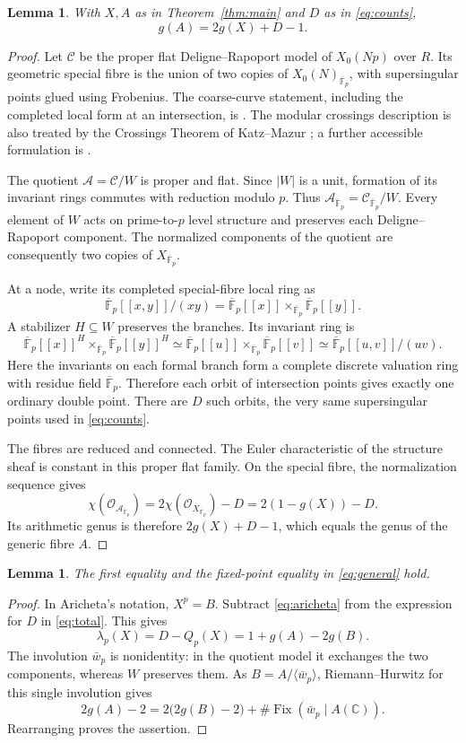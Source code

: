 \documentclass[11pt,a4paper]{article}
\newtheorem{lemma}[theorem]{Lemma}
\theoremstyle{remark}\newtheorem{remark}[theorem]{Remark}
\numberwithin{equation}{section}
\newcommand{\C}{\mathbb C}\newcommand{\Fp}{\mathbb F_p}
\newcommand{\kk}{\overline{\mathbb F}_p}
\newcommand{\Fix}{\operatorname{Fix}}
\begin{document}
\begin{lemma}\label{lem:total}
With $X,A$ as in Theorem~\ref{thm:main} and $D$ as in \eqref{eq:counts},
\begin{equation}\label{eq:total}
g(A)=2g(X)+D-1.
\end{equation}
\end{lemma}
\begin{proof}
Let $\mathscr C$ be the proper flat Deligne--Rapoport model of $X_0(Np)$ over $R$. Its geometric special fibre is the union of two copies of $X_0(N)_{\kk}$, with supersingular points glued using Frobenius. The coarse-curve statement, including the completed local form at an intersection, is \cite[VI, Theorem 6.9(ii)--(iii), Corollary 6.10]{DR}. The modular crossings description is also treated by the Crossings Theorem of Katz--Mazur \cite[Theorem 13.1.3, p.~390]{KM}; a further accessible formulation is \cite[Theorem 2.7]{Niles}.

The quotient $\mathscr A=\mathscr C/W$ is proper and flat. Since $|W|$ is a unit, formation of its invariant rings commutes with reduction modulo $p$. Thus $\mathscr A_{\kk}=\mathscr C_{\kk}/W$. Every element of $W$ acts on prime-to-$p$ level structure and preserves each Deligne--Rapoport component. The normalized components of the quotient are consequently two copies of $X_{\kk}$.

At a node, write its completed special-fibre local ring as
\[
\kk[[x,y]]/(xy)
=\kk[[x]]\mathbin{\times}_{\kk}\kk[[y]].
\]
A stabilizer $H\subseteq W$ preserves the branches. Its invariant ring is
\[
\kk[[x]]^H\mathbin{\times}_{\kk}\kk[[y]]^H
\simeq\kk[[u]]\mathbin{\times}_{\kk}\kk[[v]]
\simeq\kk[[u,v]]/(uv).
\]
Here the invariants on each formal branch form a complete discrete valuation ring with residue field $\kk$. Therefore each orbit of intersection points gives exactly one ordinary double point. There are $D$ such orbits, the very same supersingular points used in \eqref{eq:counts}.

The fibres are reduced and connected. The Euler characteristic of the structure sheaf is constant in this proper flat family. On the special fibre, the normalization sequence gives
\[
\chi(\mathcal O_{\mathscr A_{\kk}})
=2\chi(\mathcal O_{X_{\kk}})-D=2(1-g(X))-D.
\]
Its arithmetic genus is therefore $2g(X)+D-1$, which equals the genus of the generic fibre $A$.
\end{proof}

\begin{lemma}\label{lem:single}
The first equality and the fixed-point equality in \eqref{eq:general} hold.
\end{lemma}
\begin{proof}
In Aricheta's notation, $X^p=B$. Subtract \eqref{eq:aricheta} from the expression for $D$ in \eqref{eq:total}. This gives
\[
\lambda_p(X)=D-Q_p(X)=1+g(A)-2g(B).
\]
The involution $\bar w_p$ is nonidentity: in the quotient model it exchanges the two components, whereas $W$ preserves them. As $B=A/\langle\bar w_p\rangle$, Riemann--Hurwitz for this single involution gives
\[
2g(A)-2=2\bigl(2g(B)-2\bigr)
+\#\Fix(\bar w_p\mid A(\C)).
\]
Rearranging proves the assertion.
\end{proof}
\end{document}
